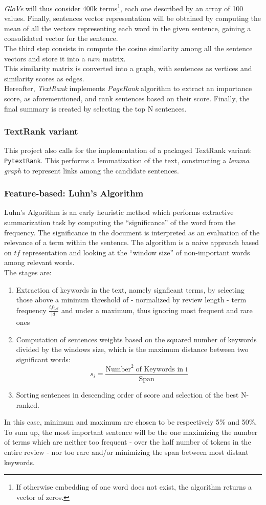 \documentclass[fleqn,10pt]{SelfArx} %
\begin{document}
\textit{GloVe} will thus consider 400k terms\footnote{If otherwise embedding of one word does not exist, the algorithm returns a vector of zeros.}, each one described by an array of 100 values. Finally, sentences vector representation will be obtained by computing the mean of all the vectors representing each word in the given sentence, gaining a consolidated vector for the sentence.\\
The third step consists in compute the cosine similarity among all the sentence vectors and store it into a $nxn$ matrix.\\
This similarity matrix is converted into a graph, with sentences as vertices and similarity scores as edges.\\
Hereafter, \textit{TextRank} implements \textit{PageRank} algorithm to extract an importance score, as aforementioned, and rank sentences based on their score. Finally, the final summary is created by selecting the top N sentences.
\subsubsection{TextRank variant}
This project also calls for the implementation of a packaged TextRank variant: \texttt{PytextRank}. This performs a lemmatization of the text, constructing a \textit{lemma graph} to represent links among the candidate sentences.
\subsubsection{Feature-based: Luhn's Algorithm}
Luhn's Algorithm is an early heuristic method which performs extractive summarization task by computing the “significance” of the word from the frequency. The significance in the document is interpreted as an evaluation of the relevance of a term within the sentence. The algorithm is a naive approach based on $tf$ representation and looking at the “window size” of non-important words among relevant words.\\
The stages are:
\begin{enumerate}
  \item Extraction of keywords in the text, namely signficant terms, by selecting those above a mininum threshold of - normalized by review length - term frequency $\frac{tf_{t,d}}{|d|}$ and under a maximum, thus ignoring most frequent and rare ones 
  \item Computation of sentences weights based on the squared number of keywords divided by the windows size, which is the maximum distance between two significant words: $$s_i=\frac{\text{Number}^2\;\text{of Keywords in i}}{\text{Span}}$$
  \item Sorting sentences in descending order of score and selection of the best N-ranked.
\end{enumerate}
In this case, minimum and maximum are chosen to be respectively 5\% and 50\%.\\
To sum up, the most important sentence will be the one maximizing the number of terms which are neither too frequent - over the half number of tokens in the entire review - nor too rare and/or minimizing the span between most distant keywords.
\end{document}
